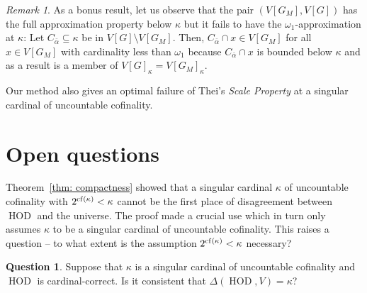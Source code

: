 \documentclass[11pt]{amsart}
\theoremstyle{definition}
\newtheorem{question}[theorem]{Question}
\theoremstyle{remark}
\newtheorem{remark}[theorem]{Remark}
\DeclareMathOperator{\HOD}{HOD}
\newcommand{\cf}{{\rm cf}}
\def\s{\subseteq}
\newcommand\tom[1]{\marginpar{Tom: #1}}
\newcommand\ale[1]{\marginpar{Alejandro: #1}}
\begin{document}
     \begin{remark}
       As a bonus result, let us observe that   the pair $(V[G_M], V[G])$ has the full approximation property below $\kappa$ but it fails to have the  $\omega_1$-approximation at $\kappa$: Let $C_{\bar\alpha}\s \kappa$ be in $V[G]\setminus V[G_M]$. Then, $C_{\bar\alpha}\cap x\in V[G_M]$ for all $x\in V[G_M]$ with cardinality less than  $\omega_1$ because $C_{\bar\alpha}\cap x$ is bounded below $\kappa$ and as a result is a member of $V[G]_\kappa = V[G_M]_\kappa$. 

       Our method also gives an optimal failure of Thei's \emph{Scale Property} \cite{SebaPhD} at a singular cardinal of uncountable cofinality. 
     \end{remark}

     \section{Open questions}\label{sec: open questions}
Theorem~\ref{thm: compactness} showed that a singular cardinal $\kappa$ of uncountable cofinality with $2^{\cf(\kappa)}<\kappa$ cannot be the first place of disagreement between $\HOD$ and the universe. The proof  made a crucial use \cite[Theorem~3.5]{GolPov} which in turn only assumes $\kappa$ to be a singular cardinal of uncountable cofinality. This raises a question -- to what extent is the assumption   $2^{\cf(\kappa)}<\kappa$ necessary?


\begin{question}
    Suppose that $\kappa$ is a singular cardinal of uncountable cofinality and $\HOD$ is cardinal-correct. Is it consistent that $\Delta(\HOD, V)=\kappa$?
\end{question}
\end{document}
